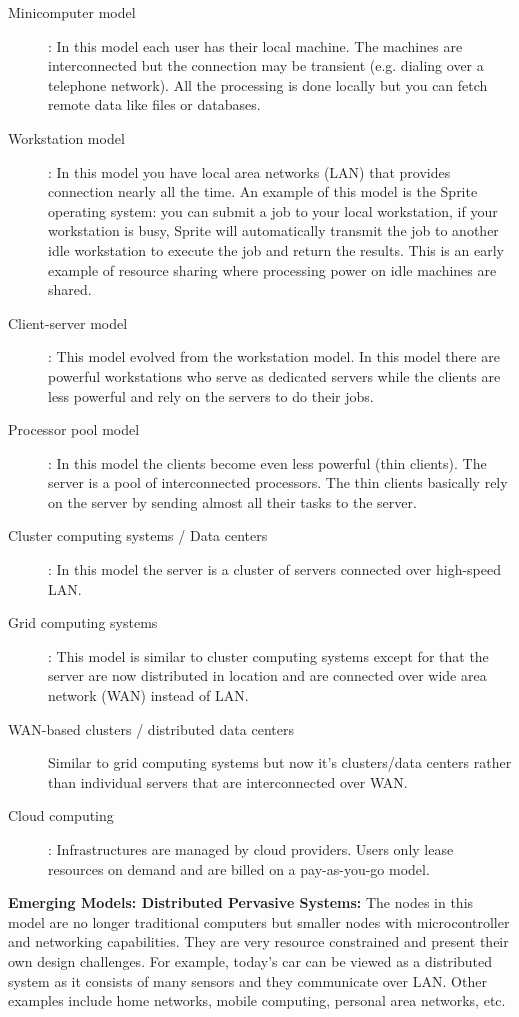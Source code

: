 \documentclass[twoside]{article}
\begin{document}
\begin{description}
  \item[Minicomputer model] : In this model each user has their local machine. The machines are interconnected but the connection may be transient (e.g. dialing over a telephone network). All the processing is done locally but you can fetch remote data like files or databases. 
  \item[Workstation model] : In this model you have local area networks (LAN) that provides connection nearly all the time. An example of this model is the Sprite operating system: you can submit a job to your local workstation, if your workstation is busy, Sprite will automatically transmit the job to another idle workstation to execute the job and return the results. This is an early example of resource sharing where processing power on idle machines are shared.
  \item[Client-server model] : This model evolved from the workstation model. In this model there are powerful workstations who serve as dedicated servers while the clients are less powerful and rely on the servers to do their jobs.
  \item[Processor pool model] : In this model the clients become even less powerful (thin clients). The server is a pool of interconnected processors. The thin clients basically rely on the server by sending almost all their tasks to the server.
  \item[Cluster computing systems / Data centers] : In this model the server is a cluster of servers connected over high-speed LAN. 
  \item[Grid computing systems] : This model is similar to cluster computing systems except for that the server are now distributed in location and are connected over wide area network (WAN) instead of LAN.
  \item[WAN-based clusters / distributed data centers] Similar to grid computing systems but now it's clusters/data centers rather than individual servers that are interconnected over WAN.
  \item[Cloud computing] : Infrastructures are managed by cloud providers. Users only lease resources on demand and are billed on a pay-as-you-go model. 
\end{description}

\textbf{Emerging Models: Distributed Pervasive Systems:} The nodes in this model are no longer traditional computers but smaller nodes with microcontroller and networking capabilities. They are very resource constrained and present their own design challenges. For example, today's car can be viewed as a distributed system as it consists of many sensors and they communicate over LAN. Other examples include home networks, mobile computing, personal area networks, etc.
\end{document}
